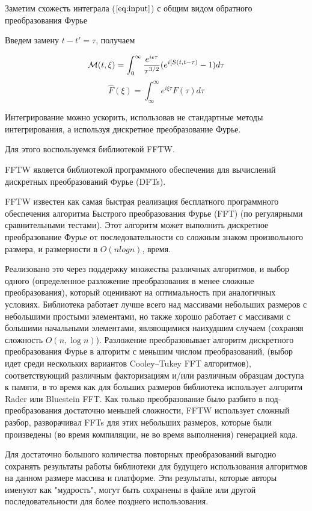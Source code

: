 \documentclass[14pt]{article}
\numberwithin{figure}{section}
\numberwithin{equation}{section}
\newcommand{\cM}{\mathcal{M}}
\begin{document}
Заметим схожесть интеграла ($\ref{eq:input}$) с общим видом обратного преобразования Фурье

Введем замену $t - t' = \tau$, получаем

\begin{equation}\label{eq:fourier}
\cM (t, \xi) = \int_{0}^{\infty}\frac{e^{i\epsilon \tau}}{{\tau}^{3/2}}(e^{i [S(t, t-\tau)} - 1) d\tau\\ 
\end{equation}
$$\hat{F}(\xi) = \int_{\infty}^{\infty}e^{i\xi \tau} F(\tau) d\tau $$

Интегрирование можно ускорить, использовав не стандартные методы интегрирования, а используя дискретное преобразование Фурье.

Для этого воспользуемся библиотекой FFTW.

FFTW является библиотекой программного обеспечения для вычислений дискретных преобразований Фурье (DFTs).\cite{fftw:website}

FFTW известен как самая быстрая реализация бесплатного программного обеспечения алгоритма Быстрого преобразования Фурье (FFT) (по регулярными сравнительными тестами). Этот алгоритм может выполнить дискретное преобразование Фурье от последовательности со сложным знаком произвольного размера, и размерности в $O (n log n)$, время.

Реализовано это через поддержку множества различных алгоритмов, и выбор одного (определенное разложение преобразования в менее сложные преобразования), который оценивают на оптимальность при аналогичных условиях. Библиотека работает лучше всего над массивами небольших размеров с небольшими простыми элементами, но также хорошо работает с массивами с большими начальными элементами, являющимися наихудшим случаем (сохраняя сложность $O (n, \log n)$). Разложение преобразовывает алгоритм дискретного преобразования Фурье в алгоритм с  меньшим числом преобразований, (выбор идет среди нескольких вариантов Cooley–Tukey FFT алгоритмов), соответствующий различным факторизациям и/или различным образцам доступа к памяти, в то время как для больших размеров библиотека использует алгоритм Rader или Bluestein FFT. Как только преобразование было разбито в под-преобразования достаточно меньшей сложности, FFTW использует сложный разбор, разворачивал FFTs для этих небольших размеров, которые были произведены (во время компиляции, не во время выполнения) генерацией кода.

Для достаточно большого количества повторных преобразований выгодно сохранять результаты работы библиотеки для будущего использования алгоритмов на данном размере массива и платформе. Эти результаты, которые авторы именуют как "мудрость", могут быть сохранены в файле или другой последовательности для более позднего использования.
\end{document}
